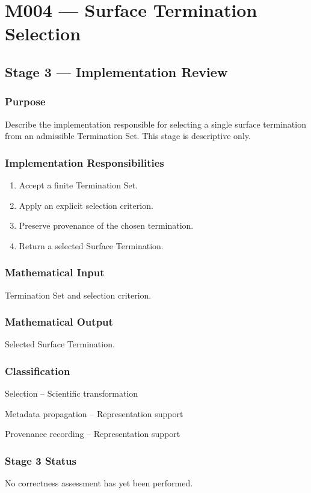 \chapter{M004 --- Surface Termination Selection}

\section{Stage 3 --- Implementation Review}

\subsection{Purpose}

Describe the implementation responsible for selecting a single surface
termination from an admissible Termination Set. This stage is
descriptive only.

\subsection{Implementation Responsibilities}

\begin{enumerate}
\item Accept a finite Termination Set.
\item Apply an explicit selection criterion.
\item Preserve provenance of the chosen termination.
\item Return a selected Surface Termination.
\end{enumerate}

\subsection{Mathematical Input}

Termination Set and selection criterion.

\subsection{Mathematical Output}

Selected Surface Termination.

\subsection{Classification}

Selection -- Scientific transformation

Metadata propagation -- Representation support

Provenance recording -- Representation support

\subsection{Stage 3 Status}

No correctness assessment has yet been performed.
